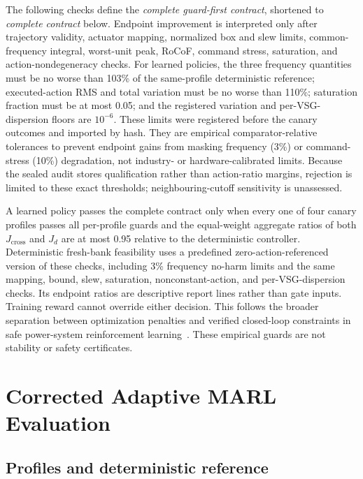 \documentclass[conference,a4paper]{IEEEtran}
\begin{document}
The following checks define the \emph{complete guard-first contract}, shortened
to \emph{complete contract} below. Endpoint improvement is interpreted only
after trajectory validity, actuator
mapping, normalized box and slew limits, common-frequency integral, worst-unit
peak, RoCoF, command stress, saturation, and action-nondegeneracy checks.
For learned policies, the three frequency quantities must be no worse than
103\% of the same-profile deterministic reference; executed-action RMS and
total variation must be no worse than 110\%; saturation fraction must be at
most 0.05; and the registered variation and per-VSG-dispersion floors are
$10^{-6}$.
These limits were registered before the canary outcomes and imported by hash.
They are empirical comparator-relative tolerances to prevent endpoint gains
from masking frequency (3\%) or command-stress (10\%) degradation, not
industry- or hardware-calibrated limits. Because the sealed audit stores
qualification rather than action-ratio margins, rejection is limited to these
exact thresholds; neighbouring-cutoff sensitivity is unassessed.

A learned policy passes the complete contract only when every one
of four canary profiles passes all per-profile guards and the equal-weight
aggregate ratios of both $J_{\mathrm{cross}}$ and $J_d$ are at most 0.95
relative to the deterministic controller. Deterministic fresh-bank feasibility
uses a predefined zero-action-referenced version of these checks, including
3\% frequency no-harm limits and the same mapping, bound, slew, saturation,
nonconstant-action, and per-VSG-dispersion checks. Its endpoint ratios are
descriptive report lines rather than gate inputs. Training reward cannot
override either decision. This follows the broader separation between
optimization penalties and verified closed-loop constraints
in safe power-system reinforcement learning~\cite{tabas2022safe,shuai2025safe}.
These empirical guards are not stability or safety certificates.

\section{Corrected Adaptive MARL Evaluation}
\label{sec:protocol}

\subsection{Profiles and deterministic reference}
\end{document}
